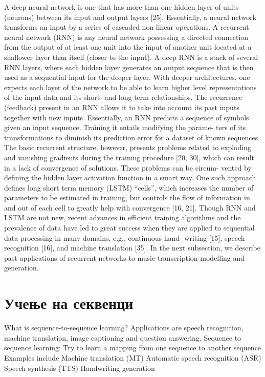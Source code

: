 \cite{Sturm2016} A deep neural network is one that has more than one hidden layer of units (neurons) between its input and output layers [25]. Essentially, a neural network transforms an input by a series of cascaded non-linear operations. A recurrent neural network (RNN) is any neural network possessing a directed connection from the output of at least one unit into the input of another unit located at a shallower layer than itself (closer to the input). A deep RNN is a stack of several RNN layers, where each hidden layer generates an output sequence that is then used as a sequential input for the deeper layer. With deeper architectures, one expects each layer of the network to be able to learn higher level representations of the input data and its short- and long-term relationships.
The recurrence (feedback) present in an RNN allows it to take into account
its past inputs together with new inputs. Essentially, an RNN predicts a sequence of symbols given an input sequence. Training it entails modifying the parame- ters of its transformations to diminish its prediction error for a dataset of known sequences. The basic recurrent structure, however, presents problems related to exploding and vanishing gradients during the training procedure [20, 30], which can result in a lack of convergence of solutions. These problems can be circum- vented by defining the hidden layer activation function in a smart way. One such approach defines long short term memory (LSTM) “cells”, which increases the number of parameters to be estimated in training, but controls the flow of information in and out of each cell to greatly help with convergence [16, 21]. Though RNN and LSTM are not new, recent advances in efficient training
algorithms and the prevalence of data have led to great success when they are applied to sequential data processing in many domains, e.g., continuous hand- writing [15], speech recognition [16], and machine translation [35]. In the next subsection, we describe past applications of recurrent networks to music transcription modelling and generation.
  
 
\section{Учење на секвенци}

What is sequence-to-sequence learning?
Applications are speech recognition, machine translation, image captioning and question answering.
Sequence to sequence learning:
Try to learn a mapping from one sequence to another sequence
Examples include
Machine translation (MT)
Automatic speech recognition (ASR)
Speech synthesis (TTS)
Handwriting generation

